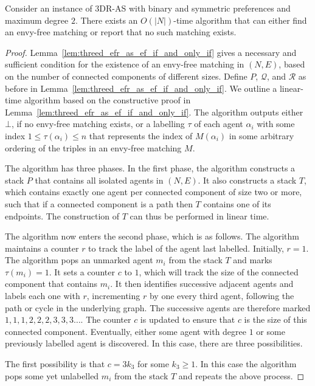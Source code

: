 \begin{thm}
\label{thm:threed_efr_as_ef_algorithm}
Consider an instance of 3DR-AS with binary and symmetric preferences and maximum degree $2$. There exists an $O(|N|)$-time algorithm that can either find an envy-free matching or report that no such matching exists.
\end{thm}
\begin{proof}
Lemma~\ref{lem:threed_efr_as_ef_if_and_only_if} gives a necessary and sufficient condition for the existence of an envy-free matching in $(N, E)$, based on the number of connected components of different sizes. Define $P$, $\mathcal{Q}$, and $\mathcal{R}$ as before in Lemma~\ref{lem:threed_efr_as_ef_if_and_only_if}. We outline a linear-time algorithm based on the constructive proof in Lemma~\ref{lem:threed_efr_as_ef_if_and_only_if}. The algorithm outputs either $\bot$, if no envy-free matching exists, or a labelling $\tau$ of each agent $\alpha_i$ with some index $1\leq \tau(\alpha_i) \leq n$ that represents the index of $M(\alpha_i)$ in some arbitrary ordering of the triples in an envy-free matching $M$. 

The algorithm has three phases. In the first phase, the algorithm constructs a stack $P$ that contains all isolated agents in $(N, E)$. It also constructs a stack $T$, which contains exactly one agent per connected component of size two or more, such that if a connected component is a path then $T$ contains one of its endpoints. The construction of $T$ can thus be performed in linear time.

The algorithm now enters the second phase, which is as follows. The algorithm maintains a counter $r$ to track the label of the agent last labelled. Initially, $r=1$. The algorithm pops an unmarked agent $m_i$ from the stack $T$ and marks $\tau(m_i)=1$. It sets a counter $c$ to $1$, which will track the size of the connected component that contains $m_i$. It then identifies successive adjacent agents and labels each one with $r$, incrementing $r$ by one every third agent, following the path or cycle in the underlying graph. The successive agents are therefore marked $1,1,1,2,2,2,3,3,3\dots$. The counter $c$ is updated to ensure that $c$ is the size of this connected component. Eventually, either some agent with degree $1$ or some previously labelled agent is discovered. In this case, there are three possibilities. 

The first possibility is that $c=3{k_3}$ for some ${k_3}\geq 1$. In this case the algorithm pops some yet unlabelled $m_i$ from the stack $T$ and repeats the above process. 


\end{proof}
